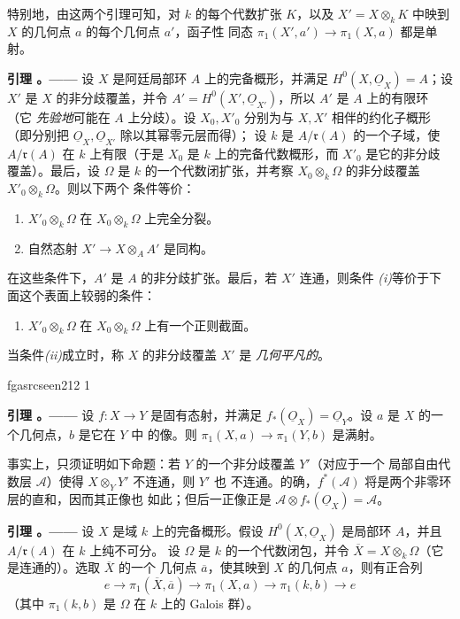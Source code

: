 \documentclass[12pt,twoside,openany]{book}
\numberwithin{equation}{section}
\newcommand{\fgaunitid}{unbound}
\newcommand{\src}[1]{%
  \phantomsection
  \hypertarget{src:\fgaunitid:#1}{}%
  \hypertarget{fga.\fgaunitid.p#1}{}%
  \ifcsname fgasrcseen#1\endcsname\else
    \expandafter\gdef\csname fgasrcseen#1\endcsname{1}%
    \hypertarget{src:#1}{}%
  \fi
  \marginpar{\raggedleft\footnotesize\sffamily #1}%
}
\newcommand{\Osh}{\underline{O}}
\theoremstyle{plain}
\theoremstyle{definition}
\theoremstyle{remark}
\newcommand{\result}[2]{%
  \par\medskip\noindent\textbf{#1%
  \if\relax\detokenize{#2}\relax\else\space#2\fi。——}\enspace
}
\begin{document}
特别地，由这两个引理可知，对 $k$ 的每个代数扩张 $K$，以及
$X'=X\otimes_k K$ 中映到 $X$ 的几何点 $a$ 的每个几何点 $a'$，函子性
同态 $\pi_1(X',a')\longrightarrow\pi_1(X,a)$ 都是单射。

\result{引理}{3} 设 $X$ 是阿廷局部环 $A$ 上的完备概形，并满足
$H^0(X,\Osh_X)=A$；设 $X'$ 是 $X$ 的非分歧覆盖，并令
$A'=H^0(X',\Osh_{X'})$，所以 $A'$ 是 $A$ 上的有限环（它
\textit{先验地}可能在 $A$ 上分歧）。设 $X_0,X'_0$ 分别为与 $X,X'$
相伴的约化子概形（即分别把 $\Osh_X,\Osh_{X'}$ 除以其幂零元层而得）；
设 $k$ 是 $A/\mathfrak r(A)$ 的一个子域，使 $A/\mathfrak r(A)$ 在 $k$
上有限（于是 $X_0$ 是 $k$ 上的完备代数概形，而 $X'_0$ 是它的非分歧
覆盖）。最后，设 $\Omega$ 是 $k$ 的一个代数闭扩张，并考察
$X_0\otimes_k\Omega$ 的非分歧覆盖 $X'_0\otimes_k\Omega$。则以下两个
条件等价：
\begin{enumerate}
  \item[\textit{i.}] $X'_0\otimes_k\Omega$ 在
    $X_0\otimes_k\Omega$ 上完全分裂。
  \item[\textit{ii.}] 自然态射
    $X'\longrightarrow X\otimes_A A'$ 是同构。
\end{enumerate}
在这些条件下，$A'$ 是 $A$ 的非分歧扩张。最后，若 $X'$ 连通，则条件
\textit{(i)}等价于下面这个表面上较弱的条件：
\begin{enumerate}
  \item[\textit{i bis.}] $X'_0\otimes_k\Omega$ 在
    $X_0\otimes_k\Omega$ 上有一个正则截面。
\end{enumerate}
当条件\textit{(ii)}成立时，称 $X$ 的非分歧覆盖 $X'$ 是
\emph{几何平凡的}。

\src{212}
\result{引理}{4} 设 $f:X\longrightarrow Y$ 是固有态射，并满足
$f_*(\Osh_X)=\Osh_Y$。设 $a$ 是 $X$ 的一个几何点，$b$ 是它在 $Y$ 中
的像。则 $\pi_1(X,a)\longrightarrow\pi_1(Y,b)$ 是满射。

事实上，只须证明如下命题：若 $Y$ 的一个非分歧覆盖 $Y'$（对应于一个
局部自由代数层 $\mathcal A$）使得 $X\otimes_Y Y'$ 不连通，则 $Y'$ 也
不连通。的确，$f^*(\mathcal A)$ 将是两个非零环层的直和，因而其正像也
如此；但后一正像正是
$\mathcal A\otimes f_*(\Osh_X)=\mathcal A$。

\result{引理}{5} 设 $X$ 是域 $k$ 上的完备概形。假设
$H^0(X,\Osh_X)$ 是局部环 $A$，并且 $A/\mathfrak r(A)$ 在 $k$ 上纯不可分。
设 $\Omega$ 是 $k$ 的一个代数闭包，并令
$\overline X=X\otimes_k\Omega$（它是连通的）。选取 $\overline X$ 的一个
几何点 $\overline a$，使其映到 $X$ 的几何点 $a$，则有正合列
\[
  e\longrightarrow\pi_1(\overline X,\overline a)
  \longrightarrow\pi_1(X,a)
  \longrightarrow\pi_1(k,b)\longrightarrow e
\]
（其中 $\pi_1(k,b)$ 是 $\Omega$ 在 $k$ 上的 Galois 群）。
\end{document}
